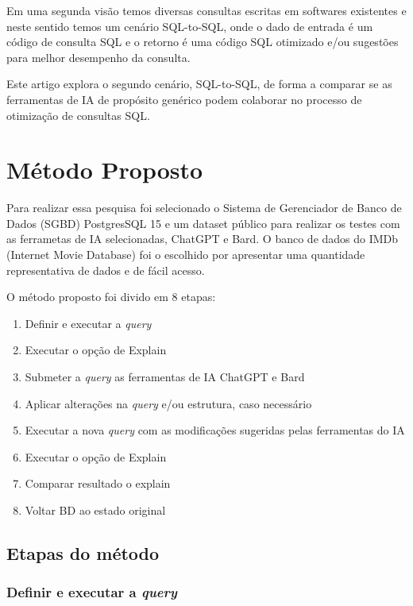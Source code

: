 \documentclass[12pt]{article}
\begin{document}
Em uma segunda visão temos diversas consultas escritas em softwares existentes e neste sentido temos um cenário SQL-to-SQL, onde o dado de entrada é um código de consulta SQL e o retorno é uma código SQL otimizado e/ou sugestões para melhor desempenho da consulta.

Este artigo explora o segundo cenário, SQL-to-SQL, de forma a comparar se as ferramentas de IA de propósito genérico podem colaborar no processo de otimização de consultas SQL.

\section{Método Proposto}

Para realizar essa pesquisa foi selecionado o Sistema de Gerenciador de Banco de Dados (SGBD) PostgresSQL 15 e um dataset público para realizar os testes com as ferrametas de IA selecionadas, ChatGPT e Bard. O banco de dados do IMDb (Internet Movie Database) \cite{developer_imdb} foi o escolhido por apresentar uma quantidade representativa de dados e de fácil acesso.

O método proposto foi divido em 8 etapas:

\begin{enumerate}
  \item Definir e executar a \emph{query}
  \item Executar o opção de Explain
  \item Submeter a \emph{query} as ferramentas de IA ChatGPT e Bard
  \item Aplicar alterações na \emph{query} e/ou estrutura, caso necessário
  \item Executar a nova \emph{query} com as modificações sugeridas pelas ferramentas do IA
  \item Executar o opção de Explain
  \item Comparar resultado o explain
  \item Voltar BD ao estado original
\end{enumerate}

\subsection{Etapas do método}

\subsubsection{Definir e executar a \emph{query}}
\end{document}
